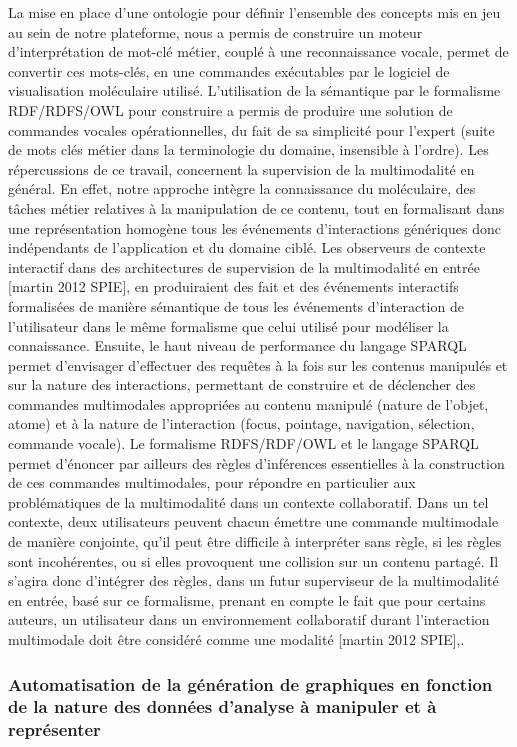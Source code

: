 La mise en place d'une ontologie pour définir l'ensemble des concepts mis en jeu au sein de notre plateforme, nous a permis de construire un moteur d'interprétation de mot-clé métier, couplé à une reconnaissance vocale, permet de convertir ces mots-clés, en une commandes exécutables par le logiciel de visualisation moléculaire utilisé. L'utilisation de la sémantique par le formalisme RDF/RDFS/OWL pour construire a permis de produire une solution de commandes vocales opérationnelles, du fait de sa simplicité pour l'expert (suite de mots clés métier dans la terminologie du domaine, insensible à l'ordre). Les répercussions de ce travail, concernent la supervision de la multimodalité en général. En effet, notre approche intègre la connaissance du moléculaire, des tâches métier relatives à la manipulation de ce contenu, tout en formalisant dans une représentation homogène tous les événements d'interactions génériques donc indépendants de l'application et du domaine ciblé. Les observeurs de contexte interactif dans des architectures de supervision de la multimodalité en entrée [martin 2012 SPIE], en produiraient des fait et des événements interactifs formalisées de manière sémantique de tous les événements d'interaction de l'utilisateur dans le même formalisme que celui utilisé pour modéliser la connaissance. Ensuite, le haut niveau de performance du langage SPARQL permet d'envisager d'effectuer des requêtes à la fois sur les contenus manipulés et sur la nature des interactions, permettant de construire et de déclencher des commandes multimodales appropriées au contenu manipulé (nature de l'objet, atome) et à la nature de l'interaction (focus, pointage, navigation, sélection, commande vocale). Le formalisme RDFS/RDF/OWL et le langage SPARQL permet d'énoncer par ailleurs des règles d'inférences essentielles à la construction de ces commandes multimodales, pour répondre en particulier aux problématiques de la multimodalité dans un contexte collaboratif. 
Dans un tel contexte, deux utilisateurs peuvent chacun émettre une commande multimodale de manière conjointe, qu'il peut être difficile à interpréter sans règle, si les règles sont incohérentes, ou si elles provoquent une collision sur un contenu partagé. Il s'agira donc d'intégrer des règles, dans un futur superviseur de la multimodalité en entrée, basé sur ce formalisme, prenant en compte le fait que pour certains auteurs, un utilisateur dans un environnement collaboratif durant l'interaction multimodale doit être considéré comme une modalité [martin 2012 SPIE],.


\subsubsection*{Automatisation de la génération de graphiques en fonction de la nature des données d'analyse à manipuler et à représenter}

